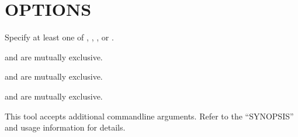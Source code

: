 \documentclass[letterpaper,10pt,english]{sphinxmanual}
\begin{document}
\section{OPTIONS}
\label{\detokenize{mariadb-kill:options}}
Specify at least one of {\hyperref[\detokenize{mariadb-kill:cmdoption-mariadb-kill-kill}]{}}, {\hyperref[\detokenize{mariadb-kill:cmdoption-mariadb-kill-kill-query}]{}}, {\hyperref[\detokenize{mariadb-kill:cmdoption-mariadb-kill-print}]{}}, {\hyperref[\detokenize{mariadb-kill:cmdoption-mariadb-kill-execute-command}]{}} or {\hyperref[\detokenize{mariadb-kill:cmdoption-mariadb-kill-stop}]{}}.

{\hyperref[\detokenize{mariadb-kill:cmdoption-mariadb-kill-any-busy-time}]{}} and {\hyperref[\detokenize{mariadb-kill:cmdoption-mariadb-kill-each-busy-time}]{}} are mutually exclusive.

{\hyperref[\detokenize{mariadb-kill:cmdoption-mariadb-kill-kill}]{}} and {\hyperref[\detokenize{mariadb-kill:cmdoption-mariadb-kill-kill-query}]{}} are mutually exclusive.

{\hyperref[\detokenize{mariadb-kill:cmdoption-mariadb-kill-daemonize}]{}} and {\hyperref[\detokenize{mariadb-kill:cmdoption-mariadb-kill-test-matching}]{}} are mutually exclusive.

This tool accepts additional command\sphinxhyphen{}line arguments.  Refer to the
“SYNOPSIS” and usage information for details.
\end{document}
